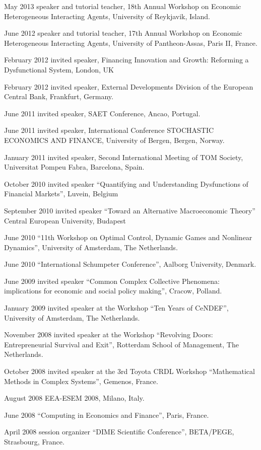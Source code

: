\documentclass[a4paper]{article}
\begin{document}
May 2013 speaker and tutorial teacher, 18th Annual Workshop on
Economic Heterogeneous Interacting Agents, University of Reykjavik,
Island.

June 2012 speaker and tutorial teacher, 17th Annual Workshop on
Economic Heterogeneous Interacting Agents, University of
Pantheon-Assas, Paris II, France.

February 2012 invited speaker, Financing Innovation and Growth:
Reforming a Dysfunctional System, London, UK

February 2012 invited speaker, External Developments Division of the
European Central Bank, Frankfurt, Germany.

June 2011 invited speaker, SAET Conference, Ancao, Portugal.

June 2011 invited speaker, International Conference STOCHASTIC
ECONOMICS AND FINANCE, University of Bergen, Bergen, Norway.

January 2011 invited speaker, Second International Meeting of TOM
Society, Universitat Pompeu Fabra, Barcelona, Spain.

October 2010 invited speaker ``Quantifying and Understanding
Dysfunctions of Financial Markets'', Luvein, Belgium

September 2010 invited speaker ``Toward an Alternative Macroeconomic
Theory'' Central European University, Budapest

June 2010 ``11th Workshop on Optimal Control, Dynamic Games and
Nonlinear Dynamics'', University of Amsterdam, The Netherlands.

June 2010 ``International Schumpeter Conference'', Aalborg University,
Denmark.

June 2009 invited speaker ``Common Complex Collective Phenomena:
implications for economic and social policy making'', Cracow, Polland.

January 2009 invited speaker at the Workshop ``Ten Years of CeNDEF'',
University of Amsterdam, The Netherlands.

November 2008 invited speaker at the Workshop ``Revolving Doors:
Entrepreneurial Survival and Exit'', Rotterdam School of Management,
The Netherlands.

October 2008 invited speaker at the 3rd Toyota CRDL Workshop
``Mathematical Methods in Complex Systems'', Gemenos, France.

August 2008 EEA-ESEM 2008, Milano, Italy.

June 2008 ``Computing in Economics and Finance'', Paris, France.

April 2008 session organizer ``DIME Scientific Conference'', BETA/PEGE,
Strasbourg, France.
\end{document}
